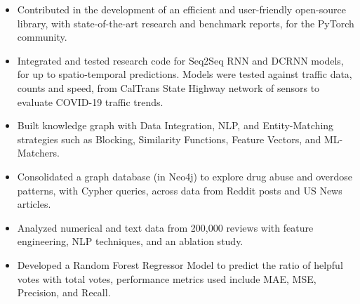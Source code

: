 \documentclass[10pt,a4paper]{altacv}
\begin{document}
\medskip





\begin{itemize}
  \item \small Contributed in the development of an efficient and user-friendly open-source library, with state-of-the-art research and benchmark reports, for the PyTorch community.
    \item \small Integrated and tested research code for Seq2Seq RNN and DCRNN models, for up to spatio-temporal predictions. Models were tested against traffic data, counts and speed, from CalTrans State Highway network of sensors to evaluate COVID-19 traffic trends. 
\end{itemize}

\medskip




\begin{itemize}
  \item \small Built knowledge graph with Data Integration, NLP, and Entity-Matching strategies such as Blocking, Similarity Functions, Feature Vectors, and ML-Matchers.
    \item \small Consolidated a graph database (in Neo4j) to explore drug abuse and overdose patterns, with Cypher queries, across data from Reddit posts and US News articles. 
\end{itemize}

\medskip




\begin{itemize}
  \item \small Analyzed numerical and text data from 200,000 reviews with feature engineering, NLP techniques, and an ablation study. 
    \item \small Developed a Random Forest Regressor Model to predict the ratio of helpful votes with total votes, performance metrics used include MAE, MSE, Precision, and Recall. 
\end{itemize}
\end{document}
